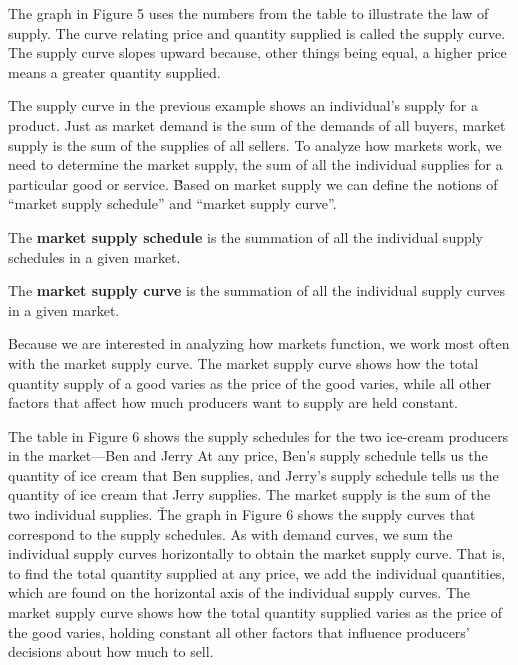 The graph in Figure 5 uses the numbers from the table to illustrate the law of supply. The curve relating price and
quantity supplied is called the supply curve. The supply curve slopes upward because, other things being equal, a
higher price means a greater quantity supplied.
\ee

The supply curve in the previous example shows an individual's supply for a product. Just as market demand is the sum
of the demands of all buyers, market supply is the sum of the supplies of all sellers. To analyze how markets work,
we need to determine the market supply, the sum of all the individual supplies for a particular good or service. \v

Based on market supply we can define the notions of ``market supply schedule'' and ``market supply curve''.

The \textbf{market supply schedule} is the summation of all the individual supply schedules in a given market.
\ed

The \textbf{market supply curve} is the summation of all the individual supply curves in a given market.
\ed

Because we are interested in analyzing how markets function, we work most often with the market supply curve. The
market supply curve shows how the total quantity supply of a good varies as the price of the good varies, while all
other factors that affect how much producers want to supply are held constant.

\be
{}

The table in Figure 6 shows the supply schedules for the two ice-cream producers in the market—Ben and Jerry At any
price, Ben's supply schedule tells us the quantity of ice cream that Ben supplies, and Jerry's supply schedule tells
us the quantity of ice cream that Jerry supplies. The market supply is the sum of the two individual supplies. \v

The graph in Figure 6 shows the supply curves that correspond to the supply schedules. As with demand curves, we
sum the individual supply curves horizontally to obtain the market supply curve. That is, to find the total quantity
supplied at any price, we add the individual quantities, which are found on the horizontal axis of the individual
supply curves. The market supply curve shows how the total quantity supplied varies as the price of the good varies,
holding constant all other factors that influence producers' decisions about how much to sell.
\ee

